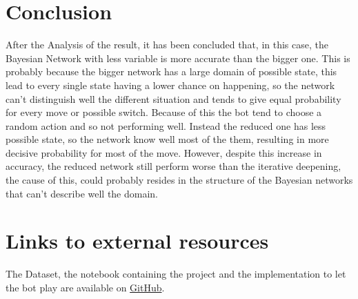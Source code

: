 \documentclass[letterpaper]{article}
\begin{document}

\section{Conclusion}
After the Analysis of the result, it has been concluded that, in this case, the Bayesian Network with less variable is more accurate than the bigger one. This is probably because the bigger network has a large domain of possible state, this lead to every single state having a lower chance on happening, so the network can't distinguish well the different situation and tends to give equal probability for every move or possible switch. Because of this the bot tend to choose a random action and so not performing well. Instead the reduced one has less possible state, so the network know well most of the them, resulting in more decisive probability for most of the move. However, despite this increase in accuracy, the reduced network still perform worse than the iterative deepening, the cause of this, could probably resides in the structure of the Bayesian networks that can't describe well the domain.


\section{Links to external resources}
The Dataset, the notebook containing the project and the implementation to let the bot play are available on \href{https://github.com/TechRufy/showdownBayesian.git}{GitHub}.
\bigskip





\end{document}
